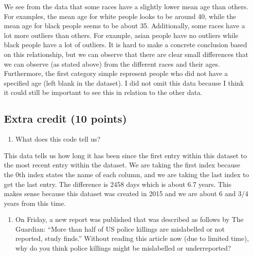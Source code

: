 \documentclass[
]{article}
\newenvironment{Shaded}{\begin{snugshade}}{\end{snugshade}}
\newcommand{\DecValTok}[1]{\textcolor[rgb]{0.00,0.00,0.81}{#1}}
\newcommand{\FunctionTok}[1]{\textcolor[rgb]{0.00,0.00,0.00}{#1}}
\newcommand{\NormalTok}[1]{#1}
\newcommand{\OtherTok}[1]{\textcolor[rgb]{0.56,0.35,0.01}{#1}}
\newcommand{\SpecialCharTok}[1]{\textcolor[rgb]{0.00,0.00,0.00}{#1}}
\providecommand{\tightlist}{%
  \setlength{\itemsep}{0pt}\setlength{\parskip}{0pt}}
\begin{document}
We see from the data that some races have a slightly lower mean age than
others. For examples, the mean age for white people looks to be around
40, while the mean age for black people seems to be about 35.
Additionally, some races have a lot more outliers than others. For
example, asian people have no outliers while black people have a lot of
outliers. It is hard to make a concrete conclusion based on this
relationship, but we can observe that there are clear small differences
that we can observe (as stated above) from the different races and their
ages. Furthermore, the first category simple represent people who did
not have a specified age (left blank in the dataset). I did not omit
this data because I think it could still be important to see this in
relation to the other data.

\hypertarget{extra-credit-10-points}{%
\subsection{Extra credit (10 points)}\label{extra-credit-10-points}}

\begin{enumerate}
\def\labelenumi{\alph{enumi}.}
\tightlist
\item
  What does this code tell us?
\end{enumerate}

\begin{Shaded}
\end{Shaded}

This data tells us how long it has been since the first entry within
this dataset to the most recent entry within the dataset. We are taking
the first index because the 0th index states the name of each column,
and we are taking the last index to get the last entry. The difference
is 2458 days which is about 6.7 years. This makes sense because this
dataset was created in 2015 and we are about 6 and 3/4 years from this
time.

\begin{enumerate}
\def\labelenumi{\alph{enumi}.}
\setcounter{enumi}{1}
\tightlist
\item
  On Friday, a new report was published that was described as follows by
  The Guardian: ``More than half of US police killings are mislabelled
  or not reported, study finds.'' Without reading this article now (due
  to limited time), why do you think police killings might be
  mislabelled or underreported?
\end{enumerate}
\end{document}

